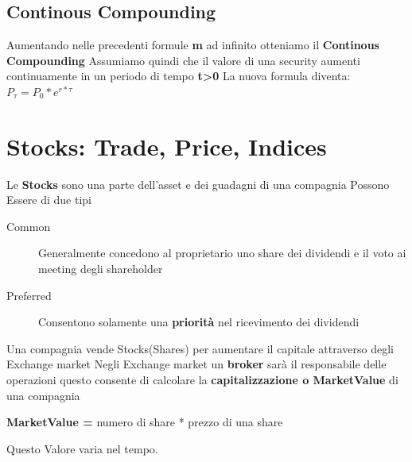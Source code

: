 \documentclass[a4paper,11pt]{report}
\begin{document}
{\subsection{Continous Compounding}
Aumentando nelle precedenti formule \textbf{m} ad infinito otteniamo il \textbf{Continous Compounding} \newline
Assumiamo quindi che il valore di una security aumenti continuamente in un periodo di tempo \textbf{t>0}\newline
La nuova formula diventa: \newline
{\LARGE {$P_\tau = P_0*e^{r*\tau}$}}
\newpage

\section{Stocks: Trade, Price, Indices}
Le \textbf{Stocks} sono una parte dell'asset e dei guadagni di una compagnia \newline
Possono Essere di due tipi
\begin{description}
\item[Common] Generalmente concedono al proprietario uno share dei dividendi e il voto ai meeting degli shareholder
\item[Preferred] Consentono solamente una \textbf{priorità} nel ricevimento dei dividendi
\end{description}
Una compagnia vende Stocks(Shares) per aumentare il capitale attraverso degli Exchange market \newline
Negli Exchange market un \textbf{broker} sarà il responsabile delle operazioni
questo consente di calcolare la \textbf{capitalizzazione o MarketValue} di una compagnia \newline
\begin{center}
\textbf{MarketValue =} numero di share  * prezzo di una share
\end{center}
Questo Valore varia nel tempo.
}
\end{document}
